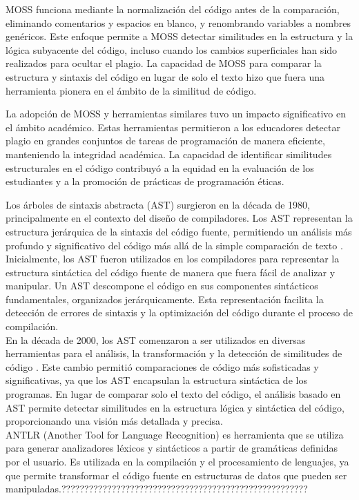 MOSS funciona mediante la normalización del código antes de la comparación, eliminando comentarios y espacios en blanco, y renombrando variables a nombres genéricos. Este enfoque permite a MOSS detectar similitudes en la estructura y la lógica subyacente del código, incluso cuando los cambios superficiales han sido realizados para ocultar el plagio. La capacidad de MOSS para comparar la estructura y sintaxis del código en lugar de solo el texto hizo que fuera una herramienta pionera en el ámbito de la similitud de código.

La adopción de MOSS y herramientas similares tuvo un impacto significativo en el ámbito académico. Estas herramientas permitieron a los educadores detectar plagio en grandes conjuntos de tareas de programación de manera eficiente, manteniendo la integridad académica. La capacidad de identificar similitudes estructurales en el código contribuyó a la equidad en la evaluación de los estudiantes y a la promoción de prácticas de programación éticas.

Los árboles de sintaxis abstracta (AST) surgieron en la década de 1980, principalmente en el contexto del diseño de compiladores. Los AST representan la estructura jerárquica de la sintaxis del código fuente, permitiendo un análisis más profundo y significativo del código más allá de la simple comparación de texto \cite{aho1986compilers}. \\

Inicialmente, los AST fueron utilizados en los compiladores para representar la estructura sintáctica del código fuente de manera que fuera fácil de analizar y manipular. Un AST descompone el código en sus componentes sintácticos fundamentales, organizados jerárquicamente. Esta representación facilita la detección de errores de sintaxis y la optimización del código durante el proceso de compilación. \\

En la década de 2000, los AST comenzaron a ser utilizados en diversas herramientas para el análisis, la transformación y la detección de similitudes de código \cite{muchnick1997advanced}. Este cambio permitió comparaciones de código más sofisticadas y significativas, ya que los AST encapsulan la estructura sintáctica de los programas. En lugar de comparar solo el texto del código, el análisis basado en AST permite detectar similitudes en la estructura lógica y sintáctica del código, proporcionando una visión más detallada y precisa. \\

ANTLR (Another Tool for Language Recognition) es herramienta que se utiliza para generar analizadores léxicos y sintácticos a partir de gramáticas definidas por el usuario. Es utilizada en la compilación y el procesamiento de lenguajes, ya que permite transformar el código fuente en estructuras de datos que pueden ser manipuladas.??????????????????????????????????????????????????????

